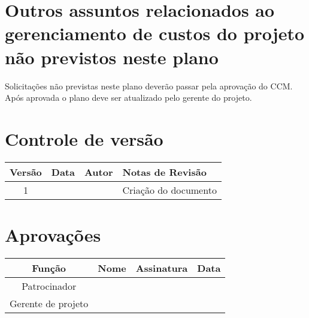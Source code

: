 \section{Outros assuntos relacionados ao gerenciamento de custos do projeto não previstos neste plano}

Solicitações não previstas neste plano deverão passar pela aprovação do CCM. Após aprovada o plano deve ser atualizado pelo gerente do projeto.

\section{Controle de versão}

\begin{table}[H]
	\begin{tabularx}{\textwidth}{| c | c | X | X |}
		\hline
		\textbf{Versão} & \textbf{Data} & \textbf{Autor}        & \textbf{Notas de Revisão} \\
		\hline
		1                &               & \projectManagerName{} & Criação do documento     \\
		\hline
	\end{tabularx}
	\centering
\end{table}

\section{Aprovações}

\begin{table}[H]
	\begin{tabularx}{\textwidth}{| c | c | X | c |}
		\hline
		\textbf{Função}  & \textbf{Nome}         & \textbf{Assinatura}        & \textbf{Data} \\
		\hline
		Patrocinador       & \projectSponsorName{} & \projectSponsorSignature{} &               \\
		\hline
		Gerente de projeto & \projectManagerName{} & \projectManagerSignature{} &               \\
		\hline
	\end{tabularx}
	\centering
\end{table}

